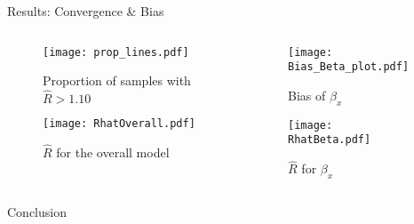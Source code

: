 \documentclass[final,hyperref={pdfpagelabels=false}]{beamer}
\begin{document}
\begin{frame}[t]
\begin{columns}[t]
\begin{column}{.465\textwidth}

\begin{block}{Results: Convergence \& Bias}
\begin{columns} %
	\begin{column}{.50\textwidth} %
		
		\begin{figure}
			\texttt{[image: prop\_lines.pdf]}
			\caption{ \scriptsize{Proportion of samples with $\hat{R} > 1.10$}}
		\end{figure}


		\begin{figure}
			\texttt{[image: RhatOverall.pdf]}
			\caption{ \scriptsize{$\hat{R}$ for the overall model}}
		\end{figure}
	\end{column}
\begin{column}{.50\textwidth} %
				\begin{figure}
					\texttt{[image: Bias\_Beta\_plot.pdf]}
					\caption{ \scriptsize{Bias of $\beta_{x}$}}
				\end{figure}
\begin{figure}
	\texttt{[image: RhatBeta.pdf]}
	\caption{ \scriptsize{$\hat{R}$ for $\beta_{x}$}}
\end{figure}

	\end{column}
\end{columns} %

\end{block}


\begin{block}{Conclusion}


\end{block}
\end{column}
\end{columns}
\end{frame}
\end{document}
